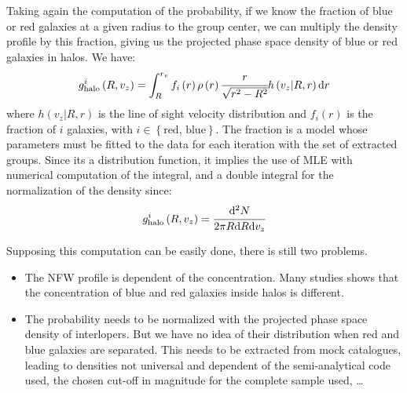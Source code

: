 Taking again the computation of the probability, if we know the fraction of
blue or red galaxies at a given radius to the group center, we can multiply the
density profile by this fraction, giving us the projected phase space density
of blue or red galaxies in halos. We have:
%
\begin{equation}
    g_\mathrm{halo}^i\left(R, v_z\right)=
    \int_R^{r_v} f_i\left(r\right) \rho\left(r\right)
    \cfrac{r}{\sqrt{r^2-R^2}} h\left(v_z|R,r\right) {\rm{d}} r
\end{equation}
%
where $h\left(v_z|R,r\right)$ is the line of sight velocity distribution and
$f_i\left(r\right)$ is the fraction of $i$ galaxies, with
$i\in\left\{\mbox{red, blue}\right\}$. The fraction is a model whose parameters
must be fitted to the data for each iteration with the set of extracted groups.
Since its a distribution function, it implies the use of MLE with numerical
computation of the integral, and a double integral for the normalization of the
density since:
%
\begin{equation}
    g_\mathrm{halo}^i\left(R, v_z\right) = \cfrac{{\rm{d}}^2N}{2\pi R{\rm{d}} R{\rm{d}} v_z}
\end{equation}

Supposing this computation can be easily done, there is still two problems.
%
\begin{itemize}
    \item The NFW profile is dependent of the concentration. Many studies shows
        that the concentration of blue and red galaxies inside halos is
        different. 
    \item The probability needs to be normalized with the projected phase space
        density of interlopers. But we have no idea of their distribution when
        red and blue galaxies are separated. This needs to be extracted from
        mock catalogues, leading to densities not universal and dependent of
        the semi-analytical code used, the chosen cut-off in magnitude for the
        complete sample used, \ldots
\end{itemize}


